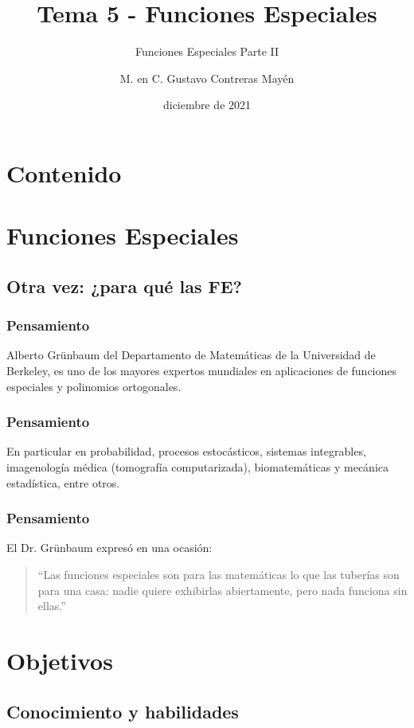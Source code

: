 \documentclass[12pt]{beamer}
\date{diciembre de 2021}
\title{\large{Tema 5 - Funciones Especiales}}
\subtitle{Funciones Especiales Parte II}
\author{M. en C. Gustavo Contreras Mayén}
\begin{document}
\maketitle
\fontsize{14}{14}\selectfont
{}

\section*{Contenido}

\section{Funciones Especiales}
\subsection{Otra vez: ¿para qué las FE?}

\begin{frame}
\frametitle{Pensamiento}
Alberto Grünbaum del Departamento de Matemáticas de la Universidad de Berkeley, es uno de los mayores expertos mundiales en aplicaciones de funciones especiales y polinomios ortogonales.
\end{frame}
\begin{frame}
\frametitle{Pensamiento}
En particular en probabilidad, procesos estocásticos, sistemas integrables, imagenología médica (tomografía computarizada), biomatemáticas y mecánica estadística, entre otros.
\end{frame}
\begin{frame}
\frametitle{Pensamiento}
El Dr. Grünbaum expresó en una ocasión:
\\
\bigskip
\pause
\begin{quote}
\enquote{Las funciones especiales son para las matemáticas lo que las tuberías son para una casa: nadie quiere exhibirlas abiertamente, pero nada funciona sin ellas.}
\end{quote}
\end{frame}

\section{Objetivos}
\subsection{Conocimiento y habilidades}
\end{document}
